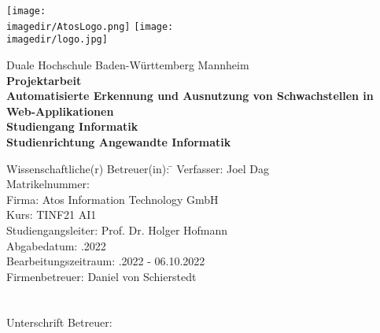 \begin{titlepage}
\begin{minipage}{\textwidth}
		\vspace{-2cm}
		\noindent \texttt{[image: \\imagedir/AtosLogo.png]} \hfill 
		\texttt{[image: \\imagedir/logo.jpg]}
\end{minipage}
\vspace{1em}
\begin{center}
	{\textsf{\large Duale Hochschule Baden-W\"urttemberg Mannheim}}\\[4em]
	{\textsf{\textbf{\large{Projektarbeit}}}}\\[6mm]
	{\textsf{\textbf{\Large{}Automatisierte Erkennung und Ausnutzung von Schwachstellen in Web-Applikationen
	}}} \\[1.5cm]
	{\textsf{\textbf{\large{}Studiengang Informatik}}\\[6mm]
	\textsf{\textbf{Studienrichtung Angewandte Informatik}}}\vspace{10em}
	
	\begin{minipage}{\textwidth}
		\begin{tabbing}
		Wissenschaftliche(r) Betreuer(in): \hspace{0.85cm}\=\kill
		Verfasser: \> Joel Dag \\[1.5mm]
		Matrikelnummer:  \\[1.5mm]
		Firma: \> Atos Information Technology GmbH  \\[1.5mm]
		Kurs: \> TINF21 AI1  \\[1.5mm]
		Studiengangsleiter: \> Prof. Dr. Holger Hofmann \\[1.5mm]
		Abgabedatum: .2022\\[1.5mm]
		Bearbeitungszeitraum: .2022 - 06.10.2022\\[1.5mm]
		Firmenbetreuer: \> Daniel von Schierstedt \\[1.5mm] \\ \\
		Unterschrift Betreuer: \> \underline {\hspace{4cm}}\\[1.5mm] 
		\end{tabbing}
	\end{minipage}
\end{center}
\end{titlepage}